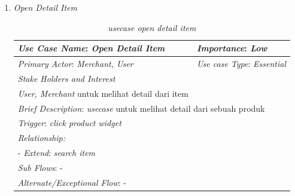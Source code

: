 \documentclass[a4paper]{article}
\begin{document}
\begin{enumerate}
\begin{enumerate}
        \item \textit{Open Detail Item}
        \begin{table}[h]
            \centering
            \caption{\textit{usecase open detail item}}
            \begin{tabular}{|lll}
            \hline
            \multicolumn{1}{|l|}{\textit{Use Case Name}: \textit{Open Detail Item}}             & \multicolumn{2}{l|}{\textit{Importance}: \textit{Low}}   \\ \hline
            \multicolumn{1}{|l|}{\textit{Primary Actor}: \textit{Merchant, User}}             & \multicolumn{2}{l|}{\textit{Use case Type}: \textit{Essential}} \\ \hline
            \multicolumn{1}{|l|}{\textit{Stake Holders and Interest}} &                               &                               \\ \cline{1-1}
            \multicolumn{1}{|l|}{\textit{User, Merchant} untuk melihat detail dari item}                                                     &                               &                               \\ \hline
            \multicolumn{3}{|l|}{\textit{Brief Description}: \textit{usecase} untuk melihat detail dari sebuah produk}                                                                         \\ \hline
            \multicolumn{3}{|l|}{\textit{Trigger}: \textit{click product widget} }                                                                                   \\ \hline
            \multicolumn{3}{|l|}{\textit{Relationship:}}                                                                              \\ \hline
            \multicolumn{3}{|l|}{- \textit{Extend}: \textit{search item}}                                                                                                                     \\ \hline
            \multicolumn{3}{|l|}{\textit{Sub Flows}: -}                                                                                 \\ \hline
            \multicolumn{3}{|l|}{\textit{Alternate/Exceptional Flow}: -}                                                                \\ \hline
            \end{tabular}
        \end{table}


\end{enumerate}
\end{enumerate}
\end{document}
